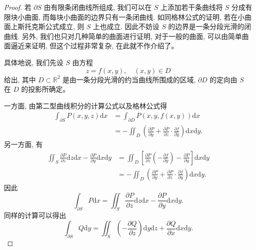 \documentclass[12pt,fontset=fandol]{ctexart}
\begin{document}
\begin{proof}\quad 若 $\partial S$ 由有限条闭曲线所组成, 我们可以在 $S$ 上添加若干条曲线将 $S$ 分成有限块小曲面, 而每块小曲面的边界只有一条闭曲线. 如同格林公式的证明, 若在小曲面上斯托克斯公式成立, 则 $S$ 上也成立. 因此不妨设 $S$ 的边界是一条分段光滑的闭曲线. 另外, 我们也只对几种简单的曲面进行证明, 对于一般的曲面, 可以由简单曲面逼近来证明, 但这个过程非常复杂, 在此就不作介绍了。

具体地说, 我们先设 $S$ 由方程
\begin{equation}
  z=f(x,y),\quad (x,y)\in D
  \label{course-eq-16-5-1}
\end{equation}
给出, 其中 $D\subset\mathbb R^2$ 是由一条分段光滑的约当曲线所围成的区域, $\partial D$ 的定向由 $S$ 在 $D$ 的投影所确定。

一方面, 由第二型曲线积分的计算公式以及格林公式得
\[
\begin{aligned}
  \int_{\partial S}P(x,y,z)\mathrm dx
  &=\int_{\partial D}P(x,y,f(x,y))\mathrm dx\\
  &=-\iint_D\left(\frac{\partial P}{\partial y}
    +\frac{\partial P}{\partial z}\cdot\frac{\partial f}{\partial y}\right)\mathrm dx\mathrm dy.
\end{aligned}
\]
另一方面, 有
\[
\begin{aligned}
  \iint_S\frac{\partial P}{\partial z}\mathrm dz\mathrm dx
  -\frac{\partial P}{\partial y}\mathrm dx\mathrm dy
  &=\iint_D\left[\frac{\partial P}{\partial z}\left(-\frac{\partial f}{\partial y}\right)
    -\frac{\partial P}{\partial y}\right]\mathrm dx\mathrm dy\\
  &=-\iint_D\left(\frac{\partial P}{\partial y}
    +\frac{\partial P}{\partial z}\cdot\frac{\partial f}{\partial y}\right)\mathrm dx\mathrm dy.
\end{aligned}
\]
因此
\[
  \int_{\partial S}P\mathrm dx
  =\iint_S\frac{\partial P}{\partial z}\mathrm dz\mathrm dx
    -\frac{\partial P}{\partial y}\mathrm dx\mathrm dy.
\]
同样的计算可以得出
\[
  \int_{\partial S}Q\mathrm dy
  =\iint_S\left(-\frac{\partial Q}{\partial z}\right)\mathrm dy\mathrm dz
    +\frac{\partial Q}{\partial x}\mathrm dx\mathrm dy.
\]


\end{proof}
\end{document}
